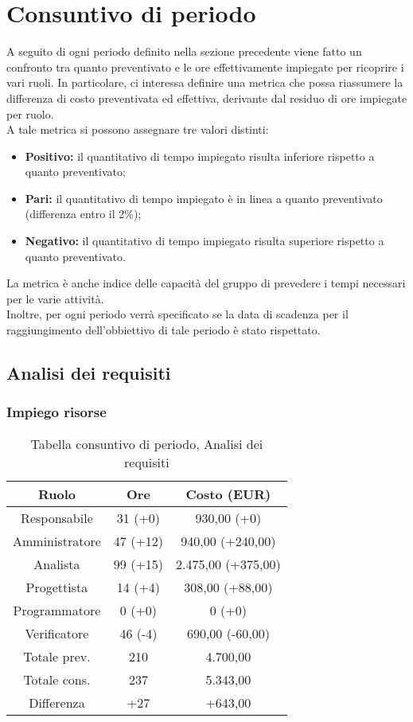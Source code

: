 \section{Consuntivo di periodo}
A seguito di ogni periodo definito nella sezione precedente viene fatto un confronto tra quanto preventivato e le ore effettivamente impiegate per ricoprire i vari ruoli. In particolare, ci interessa definire una metrica che possa riassumere la differenza di costo preventivata ed effettiva, derivante dal residuo di ore impiegate per ruolo. \\ A tale metrica si possono assegnare tre valori distinti:
\begin{itemize}
	\item \textbf{Positivo:} il quantitativo di tempo impiegato risulta inferiore rispetto a quanto preventivato;
	\item \textbf{Pari:} il quantitativo di tempo impiegato è in linea a quanto preventivato (differenza entro il 2\%);
	\item \textbf{Negativo:} il quantitativo di tempo impiegato risulta superiore rispetto a quanto preventivato.
\end{itemize}
La metrica è anche indice delle capacità del gruppo di prevedere i tempi necessari per le varie attività.
\\Inoltre, per ogni periodo verrà specificato se la data di scadenza per il raggiungimento dell'obbiettivo di tale periodo è stato rispettato.
\newpage
\subsection{Analisi dei requisiti}
\subsubsection{Impiego risorse}
\begin{table}[h]
\caption{Tabella consuntivo di periodo, Analisi dei requisiti}  
\begin{center}
\begin{tabular}{ |c|c|c|  }
 \hline
 Ruolo 		& Ore & Costo (EUR)\\
 \hline\hline
	Responsabile	& 31 (+0) & 930,00 (+0)\\
	Amministratore	& 47 (+12) & 940,00 (+240,00)\\
	Analista		& 99 (+15) & 2.475,00 (+375,00)\\
	Progettista		& 14 (+4) & 308,00 (+88,00)\\
	Programmatore	& 0 (+0) & 0 (+0)\\
	Verificatore	& 46 (-4) & 690,00 (-60,00)\\
	\hline\hline
	Totale prev.	& 210 & 4.700,00 \\
	Totale cons.	& 237 & 5.343,00 \\
	Differenza		& +27 & +643,00 \\
 \hline
\end{tabular}
\end{center}
\end{table}
